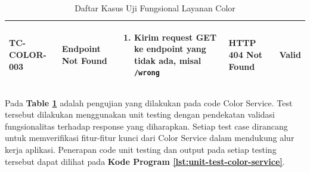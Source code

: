 \begin{table}[H]
\begin{adjustbox}{width=\textwidth}
\begin{tabular}{|p{1.5cm}|p{3.2cm}|p{5cm}|p{3.2cm}|p{1.2cm}|}
      TC-COLOR-003                                                                                                                                                                    & Endpoint Not Found        &
      \begin{enumerate}[leftmargin=*,noitemsep,topsep=0pt,label=\arabic*.,widest=99]
        \item Kirim request GET ke endpoint yang tidak ada, misal \texttt{/wrong}
      \end{enumerate}                                                                                                       &
      HTTP 404 Not Found                                                                                                                                                              & Valid                                                                                             \\ \hline
    \end{tabular}
  \end{adjustbox}
  \caption{Daftar Kasus Uji Fungsional Layanan Color}
  \label{tab:color-test-cases}
\end{table}

Pada \textbf{Table \ref{tab:color-test-cases}} adalah pengujian yang dilakukan
pada code Color Service. Test tersebut dilakukan menggunakan unit testing
dengan pendekatan validasi fungsionalitas terhadap response yang diharapkan.
Setiap test case dirancang untuk memverifikasi fitur-fitur kunci dari Color
Service dalam mendukung alur kerja aplikasi. Penerapan code unit testing dan
output pada setiap testing tersebut dapat dilihat pada \textbf{Kode Program
  \ref{lst:unit-test-color-service}}.

